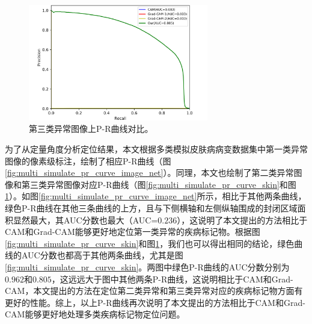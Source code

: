 \begin{figure}[H]
	\centering
	\includegraphics[width=0.7\textwidth]{figure/pr_curve_multi_skin/CIRCLE_pr_curve.png}
	\caption[第三类异常图像上P-R曲线对比]{第三类异常图像上P-R曲线对比。}
	\label{fig:multi_simulate_pr_curve_circle}
\end{figure}

为了从定量角度分析定位结果，本文根据多类模拟皮肤病病变数据集中第一类异常图像的像素级标注，绘制了相应P-R曲线（图\ref{fig:multi_simulate_pr_curve_image_net}）。同理，本文也绘制了第二类异常图像和第三类异常图像对应P-R曲线（图\ref{fig:multi_simulate_pr_curve_skin}和图\ref{fig:multi_simulate_pr_curve_circle}）。如图\ref{fig:multi_simulate_pr_curve_image_net}所示，相比于其他两条曲线，绿色P-R曲线在其他三条曲线的上方，且与下侧横轴和左侧纵轴围成的封闭区域面积显然最大，其AUC分数也最大（AUC=$0.236$），这说明了本文提出的方法相比于CAM和Grad-CAM能够更好地定位第一类异常的疾病标记物。根据图\ref{fig:multi_simulate_pr_curve_skin}和图\ref{fig:multi_simulate_pr_curve_circle}，我们也可以得出相同的结论，绿色曲线的AUC分数也都高于其他两条曲线，尤其是图\ref{fig:multi_simulate_pr_curve_skin}。两图中绿色P-R曲线的AUC分数分别为$0.962$和$0.805$，这远远大于图中其他两条P-R曲线，这说明相比于CAM和Grad-CAM，本文提出的方法在定位第二类异常和第三类异常对应的疾病标记物方面有更好的性能。综上，以上P-R曲线再次说明了本文提出的方法相比于CAM和Grad-CAM能够更好地处理多类疾病标记物定位问题。
